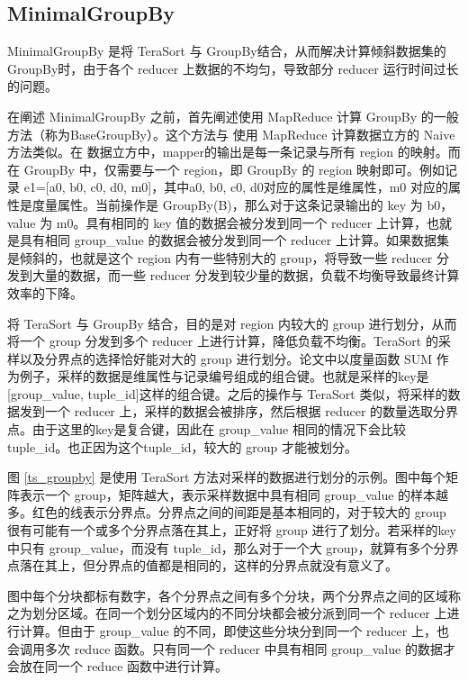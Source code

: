 \subsection{MinimalGroupBy}

MinimalGroupBy \cite{tao2013minimal} 是将 TeraSort 与 GroupBy结合，从而解决计算倾斜数据集的 GroupBy时，由于各个 reducer 上数据的不均匀，导致部分 reducer 运行时间过长的问题。

在阐述 MinimalGroupBy 之前，首先阐述使用 MapReduce 计算 GroupBy 的一般方法（称为BaseGroupBy）。这个方法与 使用 MapReduce 计算数据立方的 Naive 方法类似。在 数据立方中，mapper的输出是每一条记录与所有 region 的映射。而在 GroupBy 中，仅需要与一个 region，即 GroupBy 的 region 映射即可。例如记录 e1=[a0, b0, c0, d0, m0]，其中a0, b0, c0, d0对应的属性是维属性，m0 对应的属性是度量属性。当前操作是 GroupBy(B)，那么对于这条记录输出的 key 为 b0，value 为 m0。具有相同的 key 值的数据会被分发到同一个 reducer 上计算，也就是具有相同 group\_value 的数据会被分发到同一个 reducer 上计算。如果数据集是倾斜的，也就是这个 region 内有一些特别大的 group，将导致一些 reducer 分发到大量的数据，而一些 reducer 分发到较少量的数据，负载不均衡导致最终计算效率的下降。

将 TeraSort 与 GroupBy 结合，目的是对 region 内较大的 group 进行划分，从而将一个 group 分发到多个 reducer 上进行计算，降低负载不均衡。TeraSort 的采样以及分界点的选择恰好能对大的 group 进行划分。论文中以度量函数 SUM 作为例子，采样的数据是维属性与记录编号组成的组合键。也就是采样的key是[group\_value, tuple\_id]这样的组合键。之后的操作与 TeraSort 类似，将采样的数据发到一个 reducer 上，采样的数据会被排序，然后根据 reducer 的数量选取分界点。由于这里的key是复合键，因此在 group\_value 相同的情况下会比较 tuple\_id。也正因为这个tuple\_id，较大的 group 才能被划分。

图 \ref{ts_groupby} 是使用 TeraSort 方法对采样的数据进行划分的示例。图中每个矩阵表示一个 group，矩阵越大，表示采样数据中具有相同 group\_value 的样本越多。红色的线表示分界点。分界点之间的间距是基本相同的，对于较大的 group 很有可能有一个或多个分界点落在其上，正好将 group 进行了划分。若采样的key中只有 group\_value，而没有 tuple\_id，那么对于一个大 group，就算有多个分界点落在其上，但分界点的值都是相同的，这样的分界点就没有意义了。

图中每个分块都标有数字，各个分界点之间有多个分块，两个分界点之间的区域称之为划分区域。在同一个划分区域内的不同分块都会被分派到同一个 reducer 上进行计算。但由于 group\_value 的不同，即使这些分块分到同一个 reducer 上，也会调用多次 reduce 函数。只有同一个 reducer 中具有相同 group\_value 的数据才会放在同一个 reduce 函数中进行计算。


